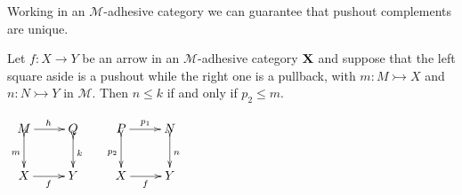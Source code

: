 \documentclass[a4paper,UKenglish,cleveref,pdftex,thm-restate,numberwithinsect]{lipics-v2021}
\def\X{\textbf {\textup{X}}}
\begin{document}
Working in an $\mathcal{M}$-adhesive category we can guarantee that pushout complements are unique. 

\noindent
\parbox{8.5cm}{
	\begin{lemma}\label{lem:radj}
		Let $f\colon X \to Y$ be an arrow in an $\mathcal{M}$-adhesive category $\X$ and suppose that the left square aside is a pushout while the  right one is a pullback, with $ m\colon M \rightarrowtail X$ and $n\colon N \rightarrowtail Y$ in $\mathcal{M}$.
		Then $n\leq k$ if and only if $p_2\leq m$.
	\end{lemma}}
\parbox{3cm}{\vspace{-2ex}
	$\xymatrix{M \ar@{>->}[d]_{m}\ar[r]^{h}& Q \ar@{>->}[d]^{k} & P \ar[r]^{p_1} \ar@{>->}[d]_{p_2}& N \ar@{>->}[d]^{n}\\X\ar[r]_{f}&Y &X \ar[r]_f&Y}$}
\end{document}
